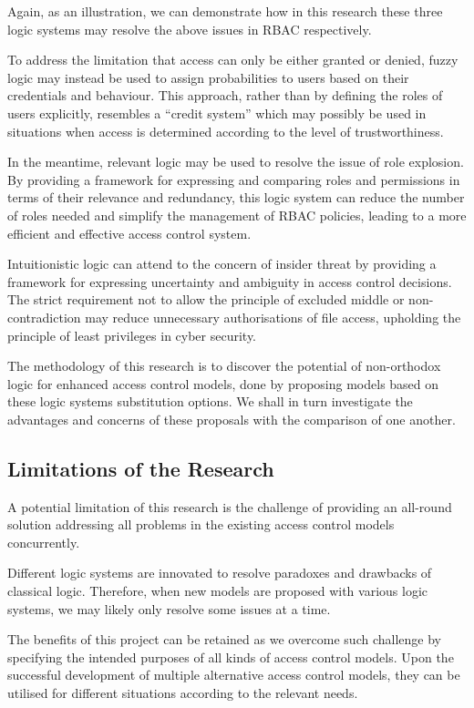 \documentclass{article}
\begin{document}
Again, as an illustration, we can demonstrate how in this research these
three logic systems may resolve the above issues in RBAC respectively.

To address the limitation that access can only be either granted or denied,
fuzzy logic may instead be used to assign probabilities to users based on their
credentials and behaviour. This approach, rather than by defining the roles of
users explicitly, resembles a ``credit system'' which may possibly be used in
situations when access is determined according to the level of trustworthiness.

In the meantime, relevant logic may be used to resolve the issue of role
explosion.\cite{role-explosion} By providing a framework for expressing and
comparing roles and permissions in terms of their relevance and redundancy,
this logic system can reduce the number of roles needed and simplify the
management of RBAC policies, leading to a more efficient and effective access
control system.

Intuitionistic logic can attend to the concern of insider threat by providing
a framework for expressing uncertainty and ambiguity in access control
decisions. The strict requirement not to allow the principle of excluded
middle or non-contradiction may reduce unnecessary authorisations of file
access, upholding the principle of least privileges in cyber security.

The methodology of this research is to discover the potential of non-orthodox
logic for enhanced access control models, done by proposing models based on
these logic systems substitution options. We shall in turn investigate the
advantages and concerns of these proposals with the comparison of one another.

\subsection*{Limitations of the Research}

A potential limitation of this research is the challenge of providing an
all-round solution addressing all problems in the existing access control
models concurrently.

Different logic systems are innovated to resolve paradoxes and drawbacks of
classical logic. Therefore, when new models are proposed with various logic
systems, we may likely only resolve some issues at a time.

The benefits of this project can be retained as we overcome such challenge by
specifying the intended purposes of all kinds of access control models. Upon
the successful development of multiple alternative access control models,
they can be utilised for different situations according to the relevant needs.
\end{document}
